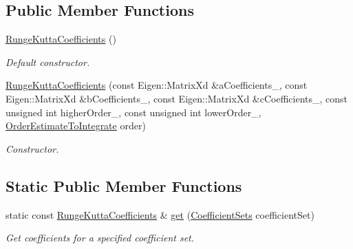 \subsection*{Public Member Functions}
\begin{DoxyCompactItemize}
\item 
\hyperlink{structtudat_1_1numerical__integrators_1_1RungeKuttaCoefficients_adbfdb02514c94b8fee1bf4e82a2e8847}{Runge\+Kutta\+Coefficients} ()
\begin{DoxyCompactList}\small\item\em Default constructor. \end{DoxyCompactList}\item 
\hyperlink{structtudat_1_1numerical__integrators_1_1RungeKuttaCoefficients_a7e872ba39e98e8aba04ac23e3a68187a}{Runge\+Kutta\+Coefficients} (const Eigen\+::\+Matrix\+Xd \&a\+Coefficients\+\_\+, const Eigen\+::\+Matrix\+Xd \&b\+Coefficients\+\_\+, const Eigen\+::\+Matrix\+Xd \&c\+Coefficients\+\_\+, const unsigned int higher\+Order\+\_\+, const unsigned int lower\+Order\+\_\+, \hyperlink{structtudat_1_1numerical__integrators_1_1RungeKuttaCoefficients_a97f8cb87fe196aa1f07f2355d0e4f8a3}{Order\+Estimate\+To\+Integrate} order)
\begin{DoxyCompactList}\small\item\em Constructor. \end{DoxyCompactList}\end{DoxyCompactItemize}
\subsection*{Static Public Member Functions}
\begin{DoxyCompactItemize}
\item 
static const \hyperlink{structtudat_1_1numerical__integrators_1_1RungeKuttaCoefficients}{Runge\+Kutta\+Coefficients} \& \hyperlink{structtudat_1_1numerical__integrators_1_1RungeKuttaCoefficients_abadf6be2eb5a42a4890b40ddc707789f}{get} (\hyperlink{structtudat_1_1numerical__integrators_1_1RungeKuttaCoefficients_a462b6c2e353f7f84ce09e693fb6c7f17}{Coefficient\+Sets} coefficient\+Set)
\begin{DoxyCompactList}\small\item\em Get coefficients for a specified coefficient set. \end{DoxyCompactList}\end{DoxyCompactItemize}
